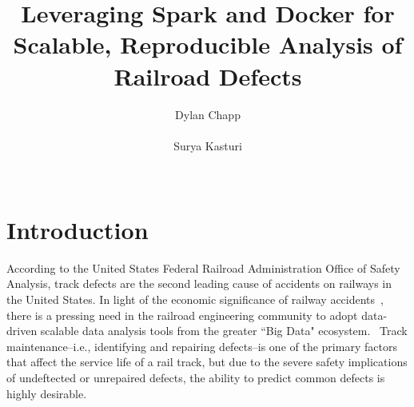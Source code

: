 \documentclass{sig-alternate-05-2015}
\begin{document}

\doi{}

\isbn{}

\conferenceinfo{}{}

\acmPrice{}

%
\conferenceinfo{}{}

\title{Leveraging Spark and Docker for Scalable, Reproducible Analysis of Railroad Defects}

\author{
\alignauthor
Dylan Chapp\\
       \\
\alignauthor
Surya Kasturi\\
       \\
}

\maketitle
\begin{abstract}
\end{abstract}

\section{Introduction}
According to the United States Federal Railroad Administration Office of Safety Analysis, track defects are the second leading cause of accidents on railways in the United States.
In light of the economic significance of railway accidents~\cite{Schafer:08}, there is a pressing need in the railroad engineering community to adopt data-driven scalable data analysis tools from the greater ``Big Data" ecosystem.~\cite{Zarembski:14} 
Track maintenance--i.e., identifying and repairing defects--is one of the primary factors that affect the service life of a rail track, but due to the severe safety implications of undeftected or unrepaired defects, the ability to predict common defects is highly desirable. 
\end{document}
